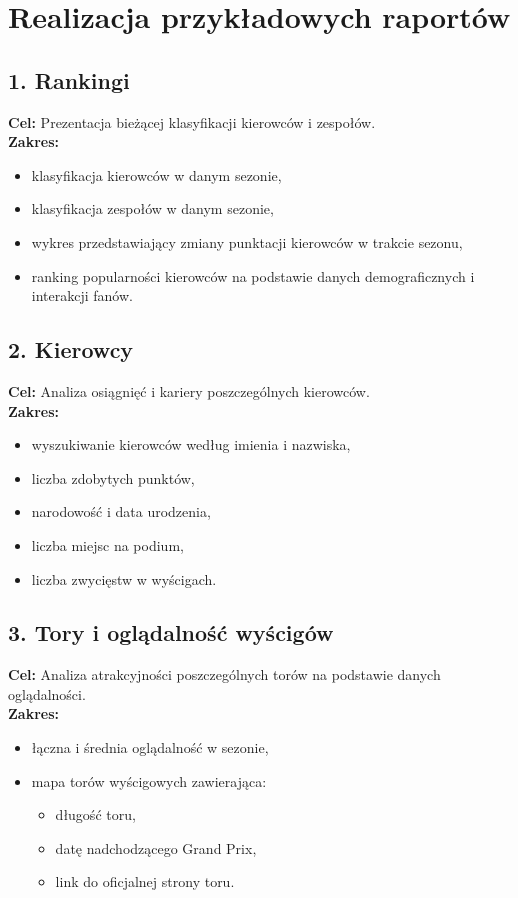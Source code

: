 \documentclass[12pt]{article}
\begin{document}
\section{Realizacja przykładowych raportów}

\subsection*{1. Rankingi}

\textbf{Cel:} Prezentacja bieżącej klasyfikacji kierowców i zespołów.\\
\textbf{Zakres:}
\begin{itemize}
    \item klasyfikacja kierowców w danym sezonie,
    \item klasyfikacja zespołów w danym sezonie,
    \item wykres przedstawiający zmiany punktacji kierowców w trakcie sezonu,
    \item ranking popularności kierowców na podstawie danych demograficznych i interakcji fanów.
\end{itemize}

\subsection*{2. Kierowcy}

\textbf{Cel:} Analiza osiągnięć i kariery poszczególnych kierowców.\\
\textbf{Zakres:}
\begin{itemize}
    \item wyszukiwanie kierowców według imienia i nazwiska,
    \item liczba zdobytych punktów,
    \item narodowość i data urodzenia,
    \item liczba miejsc na podium,
    \item liczba zwycięstw w wyścigach.
\end{itemize}

\subsection*{3. Tory i oglądalność wyścigów}

\textbf{Cel:} Analiza atrakcyjności poszczególnych torów na podstawie danych oglądalności.\\
\textbf{Zakres:}
\begin{itemize}
    \item łączna i średnia oglądalność w sezonie,
    \item mapa torów wyścigowych zawierająca:
    \begin{itemize}
        \item długość toru,
        \item datę nadchodzącego Grand Prix,
        \item link do oficjalnej strony toru.
    \end{itemize}
\end{itemize}
\end{document}

